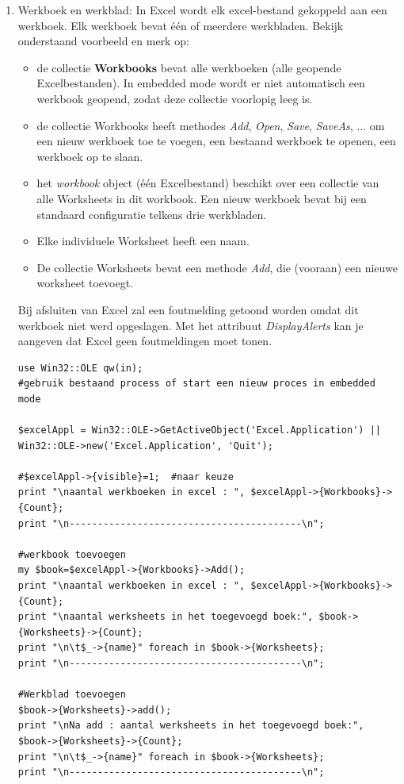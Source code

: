 \documentclass[11pt,a4paper]{report}
\begin{document}
\begin{enumerate}
	\item Werkboek en werkblad: In Excel wordt elk excel-bestand gekoppeld aan een werkboek. Elk werkboek bevat één of meerdere werkbladen. Bekijk onderstaand voorbeeld en merk op:
	\begin{itemize} 
	\item de collectie \textbf{Workbooks} bevat alle werkboeken (alle geopende Excelbestanden). In embedded mode wordt er niet automatisch een werkbook geopend, zodat deze collectie voorlopig leeg is.
	\item de collectie Workbooks heeft methodes \textit{Add}, \textit{Open}, \textit{Save}, \textit{SaveAs}, ... om een nieuw werkboek toe te voegen, een bestaand werkboek te openen, een werkboek op te slaan.
	\item het \textit{workbook} object (één Excelbestand) beschikt over een collectie van alle Worksheets in dit workbook. Een nieuw werkboek bevat bij een standaard configuratie telkens drie werkbladen.
	\item Elke individuele Worksheet heeft een naam.
	\item De collectie Worksheets bevat een methode \textit{Add}, die (vooraan) een nieuwe worksheet toevoegt.
	\end{itemize}
	Bij afsluiten van Excel zal een foutmelding getoond worden omdat dit werkboek niet werd opgeslagen. Met het attribuut \textit{DisplayAlerts} kan je aangeven dat Excel geen foutmeldingen moet tonen.
\begin{lstlisting}
use Win32::OLE qw(in); 
#gebruik bestaand process of start een nieuw proces in embedded mode

$excelAppl = Win32::OLE->GetActiveObject('Excel.Application') || Win32::OLE->new('Excel.Application', 'Quit');

#$excelAppl->{visible}=1;  #naar keuze
print "\naantal werkboeken in excel : ", $excelAppl->{Workbooks}->{Count};
print "\n-----------------------------------------\n";

#werkbook toevoegen
my $book=$excelAppl->{Workbooks}->Add();
print "\naantal werkboeken in excel : ", $excelAppl->{Workbooks}->{Count};
print "\naantal werksheets in het toegevoegd boek:", $book->{Worksheets}->{Count};
print "\n\t$_->{name}" foreach in $book->{Worksheets};
print "\n-----------------------------------------\n";

#Werkblad toevoegen
$book->{Worksheets}->add();
print "\nNa add : aantal werksheets in het toegevoegd boek:", $book->{Worksheets}->{Count};
print "\n\t$_->{name}" foreach in $book->{Worksheets};
print "\n-----------------------------------------\n";


\end{lstlisting}
\end{enumerate}
\end{document}
